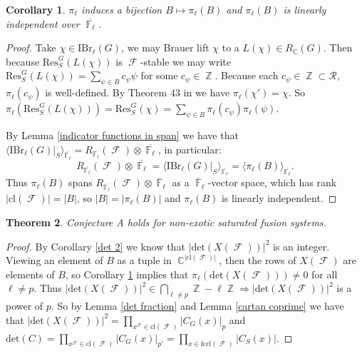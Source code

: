 \documentclass[12pt]{article}
\DeclareMathOperator{\C}{\mathbb{C}}
\DeclareMathOperator{\F}{\mathbb{F}}
\DeclareMathOperator{\Z}{\mathbb{Z}}
\DeclareMathOperator{\sF}{\mathcal{F}}
\theoremstyle{plain}
\newcounter{thmsection}
\newtheorem{thm}{Theorem}[thmsection]
\newtheorem{cor}[thm]{Corollary}
\theoremstyle{definition}
\begin{document}
\begin{cor}\label{b lin indep}
$\pi_{\ell}$ induces a bijection $B \mapsto \pi_{\ell}(B)$ and $\pi_{\ell}(B)$ is linearly independent over $\overline{\F_{\ell}}$.
\end{cor}
\begin{proof}
Take $\chi \in \text{IBr}_{\ell}(G)$, we may Brauer lift $\chi$ to a $L(\chi) \in R_{\C}(G)$. 
Then because $\mathrm{Res}^G_S(L(\chi))$ is $\sF$-stable we may write $\mathrm{Res}^G_S(L(\chi)) = \sum_{\psi \in B} c_{\psi}\psi$ for some $c_{\psi} \in \Z$.
Because each $c_{\psi} \in \Z \subset \mathcal{R}$, $\pi_{\ell}(c_{\psi})$ is well-defined. 
By Theorem 43 in \cite{serre} we have $\pi_{\ell}(\chi') = \chi$. So $\pi_{\ell}(\mathrm{Res}^G_S(L(\chi))) = \mathrm{Res}^G_S(\chi) = \sum_{\psi \in B} \pi_{\ell}(c_{\psi})\pi_{\ell}(\psi)$. 

By Lemma \ref{indicator functions in span} we have that $\langle \text{IBr}_{\ell}(G)|_S \rangle_{\overline{\F_{\ell}}} = R_{\overline{\F_{\ell}}}(\sF) \otimes \overline{\F_{\ell}}$, in particular:
\[R_{\overline{\F_{\ell}}}(\sF) \otimes \overline{\F_{\ell}} = \langle \text{IBr}_{\ell}(G)|_S \rangle_{\overline{\F_{\ell}}} = \langle \pi_{\ell}(B) \rangle_{\overline{\F_{\ell}}}.\]
Thus $\pi_{\ell}(B)$ spans $R_{\overline{\F_{\ell}}}(\sF) \otimes \overline{\F}_{\ell}$ as a $\overline{\F}_{\ell}$-vector space, 
which has rank $|\text{cl}(\sF)| = |B|$, so $|B| = |\pi_{\ell}(B)|$ and $\pi_{\ell}(B)$ is linearly independent.
\end{proof}
\begin{thm}\label{conj a for non-exotic}
Conjecture A holds for non-exotic saturated fusion systems.
\end{thm}
\begin{proof}
By Corollary \ref{det 2} we know that $|\mathrm{det}(X(\sF))|^2$ is an integer. 
Viewing an element of $B$ as a tuple in $\C^{|\text{cl}(\sF)|}$, then the rows of $X(\sF)$ are elements of $B$, 
so Corollary \ref{b lin indep} implies that $\pi_{\ell}(\mathrm{det}(X(\sF))) \neq 0$ for all $\ell \neq p$. 
Thus $|\mathrm{det}(X(\sF))|^2 \in \bigcap_{\ell \neq p} \Z-\ell\Z \Rightarrow |\mathrm{det}(X(\sF))|^2$ is a power of $p$. 
So by Lemma \ref{det fraction} and Lemma \ref{cartan coprime} we have that $|\mathrm{det}(X(\sF))|^2 = \prod_{x^{\sF} \in \text{cl}(\sF)} |C_G(x)|_{p}$ and $\mathrm{det}(C) = \prod_{x^{\sF} \in \text{cl}(\sF)} |C_G(x)|_{p'} = \prod_{x \in \text{fccl}(\sF)} |C_S(x)|$. 
\end{proof}
\end{document}
